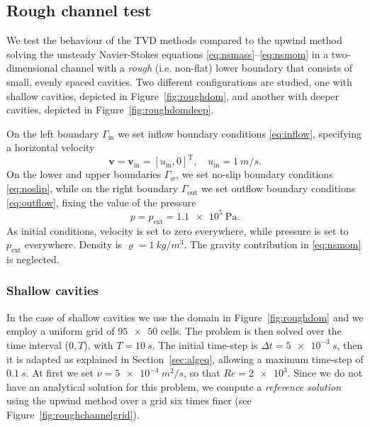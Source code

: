 \subsection{Rough channel test} \label{subsec:roughchannel}
We test the behaviour of the TVD methods compared to the upwind method solving 
the unsteady Navier-Stokes equations \eqref{eq:nsmass}--\eqref{eq:nsmom} in 
a two-dimensional channel with a \emph{rough} (i.e. non-flat) lower boundary that 
consists of small, evenly spaced cavities. Two different 
configurations are studied, one with shallow cavities, depicted in 
Figure~\ref{fig:roughdom}, and another with deeper cavities, depicted in 
Figure~\ref{fig:roughdomdeep}.

On the left boundary $\Gamma_\text{in}$ we set inflow boundary conditions 
\eqref{eq:inflow}, specifying a horizontal velocity
\begin{equation}
	\mathbf{v} = \mathbf{v}_\text{in} = [u_\text{in}, 0]^\mathrm{T}, \quad 
	u_\text{in} = \SI{1}{m/s}.
\end{equation}
On the lower and upper boundaries $\Gamma_w$, we set no-slip boundary 
conditions 
\eqref{eq:noslip}, while on the right boundary $\Gamma_\text{out}$ we set 
outflow boundary conditions \eqref{eq:outflow}, fixing the value of the pressure
\begin{equation}
	p = p_\text{ext} = \SI{1.1e5}{\pascal}.
\end{equation}
As initial conditions, velocity is set to zero everywhere, while pressure is 
set to $p_\text{ext}$ everywhere. Density is 
$\varrho=\SI{1}{kg/m^3}$. The gravity contribution in \eqref{eq:nsmom} is 
neglected.
%
\subsubsection{Shallow cavities}
In the case of shallow cavities we use the domain in Figure~\ref{fig:roughdom} 
and we employ a uniform grid of $\num{95x50}$ cells. The problem is then solved 
over the time interval ($0,T$), with $T=\SI{10}{s}$. The initial time-step is 
$\Delta t=\SI{5e-3}{s}$, then it is adapted as explained in 
Section~\ref{sec:algeq}, allowing a maximum time-step of $\SI{0.1}{s}$. 
At first we set $\nu=\SI{5e-4}{m^2/s}$, so that $Re=\num{2e3}$. Since we do not 
have an analytical solution for this problem, we compute a \emph{reference 
solution} using the upwind method over a grid six times finer (see Figure~\ref{fig:roughchannelgrid}).

